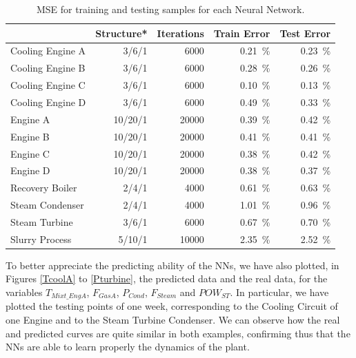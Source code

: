 \begin{table}[!t]
\label{tbl:mse}
  \centering
\caption{MSE for training and testing samples for each Neural Network.}
\label{MSE} %
\begin{tabular}{lrrrr} \toprule
 & Structure* & Iterations & Train Error & Test Error \\ \midrule
Cooling Engine A & 3/6/1 & \num{6000} & \SI{0.21}{\percent} & \SI{0.23}{\percent} \\
Cooling Engine B & 3/6/1 & \num{6000} & \SI{0.28}{\percent} & \SI{0.26}{\percent} \\
Cooling Engine C & 3/6/1 & \num{6000} & \SI{0.10}{\percent} & \SI{0.13}{\percent} \\
Cooling Engine D & 3/6/1 & \num{6000} & \SI{0.49}{\percent} & \SI{0.33}{\percent} \\
 Engine A & 10/20/1 & \num{20000} & \SI{0.39}{\percent} & \SI{0.42}{\percent} \\
 Engine B & 10/20/1 & \num{20000} & \SI{0.41}{\percent} & \SI{0.41}{\percent} \\
 Engine C & 10/20/1 & \num{20000} & \SI{0.38}{\percent} & \SI{0.42}{\percent} \\
 Engine D & 10/20/1 & \num{20000} & \SI{0.38}{\percent} & \SI{0.37}{\percent} \\
 Recovery Boiler & 2/4/1 & \num{4000} & \SI{0.61}{\percent} & \SI{0.63}{\percent} \\
 Steam Condenser & 2/4/1 & \num{4000} & \SI{1.01}{\percent} & \SI{0.96}{\percent} \\
 Steam Turbine & 3/6/1 & \num{6000} & \SI{0.67}{\percent} & \SI{0.70}{\percent} \\
 Slurry Process & 5/10/1 & \num{10000} & \SI{2.35}{\percent} & \SI{2.52}{\percent} \\
 \bottomrule
\end{tabular}
\vspace{-0.3cm}

\end{table}


To better appreciate the predicting ability of the NNs, we have also plotted, in Figures \ref{TcoolA} to  \ref{Pturbine}, the predicted data and the real data, for the variables $T_{Mixt\_EngA}$, $F_{GasA}$, $P_{Cond}$, $F_{Steam}$ and $POW_{ST}$. In particular, we have plotted the testing points of one week, corresponding to the Cooling Circuit of one Engine and to the Steam Turbine Condenser. We can observe how the  real and predicted curves are quite similar in both examples, confirming thus that the NNs are able to learn properly the dynamics of the plant. 

